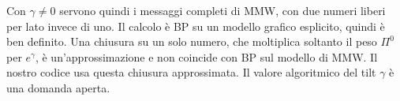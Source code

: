 Con $\gamma\ne0$ servono quindi i messaggi completi di MMW, con due numeri liberi per lato invece di uno.
Il calcolo è BP su un modello grafico esplicito, quindi è ben definito.
Una chiusura su un solo numero, che moltiplica soltanto il peso $\Pi^0$ per $e^{\gamma}$, è un'approssimazione e non coincide con BP sul modello di MMW.
Il nostro codice usa questa chiusura approssimata.
Il valore algoritmico del tilt $\gamma$ è una domanda aperta.
